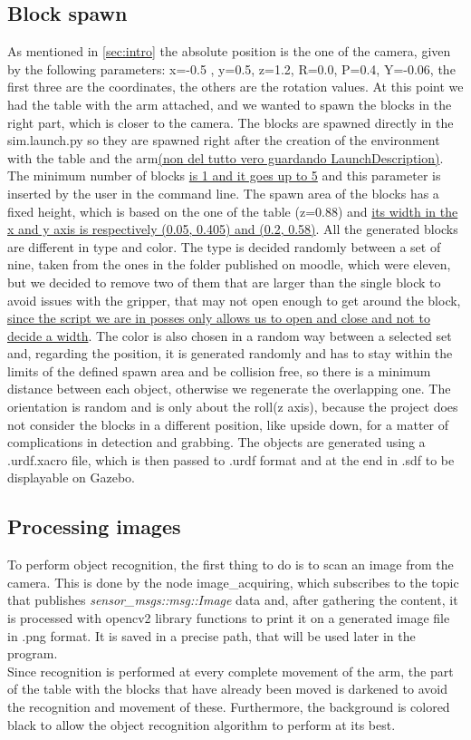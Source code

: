 \documentclass[12pt,a4paper]{article}
\begin{document}
\subsection{Block spawn}\label{subsec:blockspawn}
As mentioned in \ref{sec:intro} the absolute position is the one of the camera, given by the following parameters: x=-0.5 , y=0.5, z=1.2, R=0.0, P=0.4, Y=-0.06, the first three are the coordinates, the others are the rotation values. At this point we had the table with the arm attached, and we wanted to spawn the blocks in the right part, which is closer to the camera. The blocks are spawned directly in the sim.launch.py so they are spawned right after the creation of the environment with the table and the arm\uline{(non del tutto vero guardando LaunchDescription)}. The minimum number of blocks \uline{is 1 and it goes up to 5} and this parameter is inserted by the user in the command line. The spawn area of the blocks has a fixed height, which is based on the one of the table (z=0.88) and \uline{its width in the x and y axis is respectively (0.05, 0.405) and (0.2, 0.58)}. All the generated blocks are different in type and color. The type is decided randomly between a set of nine, taken from the ones in the folder published on moodle, which were eleven, but we decided to remove two of them that are larger than the single block to avoid issues with the gripper, that may not open enough to get around the block, \uline{since the script we are in posses only allows us to open and close and not to decide a width}. The color is also chosen in a random way between a selected set and, regarding the position, it is generated randomly and has to stay within the limits of the defined spawn area and be collision free, so there is a minimum distance between each object, otherwise we regenerate the overlapping one. The orientation is random and is only about the roll(z axis), because the project does not consider the blocks in a different position, like upside down, for a matter of complications in detection and grabbing.
The objects are generated using a .urdf.xacro file, which is then passed to .urdf format and at the end in .sdf to be displayable on Gazebo. 


\subsection{Processing images}\label{subsec:imageproc}
To perform object recognition, the first thing to do is to scan an image from the camera. This is done by the node image\_acquiring, which subscribes to the topic that publishes \textit{sensor\_msgs::msg::Image} data and, after gathering the content, it is processed with opencv2 library functions to print it on a generated image file in .png format. It is saved in a precise path, that will be used later in the program.\\Since recognition is performed at every complete movement of the arm, the part of the table with the blocks that have already been moved is darkened to avoid the recognition and movement of these. Furthermore, the background is colored black to allow the object recognition algorithm to perform at its best.
\end{document}
